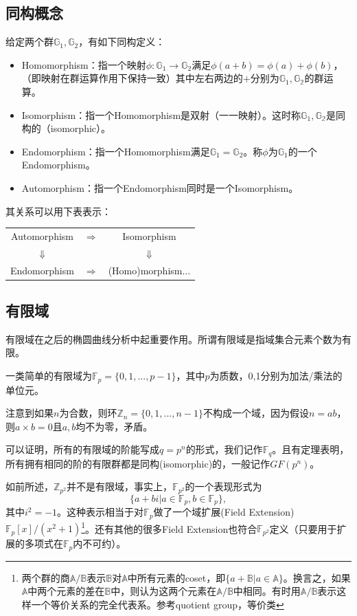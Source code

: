 \documentclass[12pt]{article}
\newcommand{\ec}{椭圆曲线}
\newcommand{\fp}{\mathbb{F}_p}
\newcommand{\fq}{\mathbb{F}_q}
\begin{document}
\subsection{同构概念}
给定两个群$\mathbb{G}_1,\mathbb{G}_2$，有如下同构定义：
\begin{itemize}
	\item Homomorphism：指一个映射$\phi: \mathbb{G}_1 \rightarrow \mathbb{G}_2$满足$\phi(a+b)=\phi(a)+\phi(b)$，（即映射在群运算作用下保持一致）其中左右两边的$+$分别为$\mathbb{G}_1, \mathbb{G_2}$的群运算。
	\item Isomorphism：指一个Homomorphism是双射（一一映射）。这时称$\mathbb{G}_1, \mathbb{G_2}$是同构的（isomorphic）。
	\item Endomorphism：指一个Homomorphism满足$\mathbb{G}_1 = \mathbb{G}_2$。称$\phi$为$\mathbb{G}_1$的一个 Endomorphism。
	\item Automorphism：指一个Endomorphism同时是一个Isomorphism。
\end{itemize}
其关系可以用下表表示：
\begin{table}[H]
	\centering
\begin{tabular}{ccc}
	Automorphism  &  $\Rightarrow$	&Isomorphism  \\
	$\Downarrow$  &							& $\Downarrow$ \\
	Endomorphism &  $\Rightarrow$	&(Homo)morphism... \\
\end{tabular}
\end{table}
\subsection{有限域}
有限域在之后的\ec 分析中起重要作用。所谓有限域是指域集合元素个数为有限。

一类简单的有限域为$\fp=\{0,1,...,p-1\}$，其中$p$为质数，0,1分别为加法/乘法的单位元。

注意到如果$n$为合数，则环$\mathbb{Z}_n= \{0,1,...,n-1\}$不构成一个域，因为假设$n=ab$，则$a \times b=0$且$a,b$均不为零，矛盾。

可以证明，所有的有限域的阶能写成$q=p^n$的形式，我们记作$\fq$。且有定理表明，所有拥有相同的阶的有限群都是同构(isomorphic)的，一般记作$GF(p^n)$。

如前所述，$\mathbb{Z}_{p^2}$并不是有限域，事实上，$\mathbb{F}_{p^2}$的一个表现形式为
$$\{ a+bi | a \in \fp, b \in \fp \},$$
其中$i^2 = -1$。这种表示相当于对$\fp$做了一个域扩展(Field Extension)$\fp[x]/(x^2+1)$\footnote{两个群的商$\mathbb{A}/\mathbb{B}$表示$\mathbb{B}$对$\mathbb{A}$中所有元素的coset，即$\{a+\mathbb{B}| a \in \mathbb{A}\}$。换言之，如果$\mathbb{A}$中两个元素的差在$\mathbb{B}$中，则认为这两个元素在$\mathbb{A}/\mathbb{B}$中相同。有时用$\mathbb{A}/\mathbb{B}$表示这样一个等价关系的完全代表系。参考quotient group，等价类}。还有其他的很多Field Extension也符合$\mathbb{F}_{p^2}$定义（只要用于扩展的多项式在$\fp$内不可约）。
\end{document}

